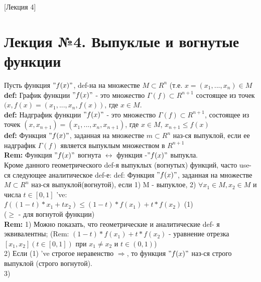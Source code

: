 [Лекция 4]

\newpage

\section{Лекция №4. Выпуклые и вогнутые функции}

Пусть функция $"f(x)"$, def-на на множестве $M \subset R^n$ (т.е. $x = (x_1, ... , x_n) \in M$ \\

\textbf{def:} График функции $"f(x)"$  - это множество $\Gamma(f) \subset R^{n+1}$ состоящее из точек $(x, f(x) = (x_1, ... , x_n, f(x))$, где $x \in M$. \\

\textbf{def:} Надграфик функции $"f(x)"$  - это множество $\Gamma(f) \subset R^{n+1}$, состоящее из точек $(x, x_{n+1}) = (x_1, ..., x_n, x_{n+1})$, где $x \in M$, $x_{n+1} \leqslant f(x)$ \\

\textbf{def:} Функция $"f(x)"$, заданная на множестве $m \subset R^n$ наз-ся выпуклой, если ее надграфик $\Gamma(f)$ является выпуклым множеством в $R^{n+1}$ \\

\textbf{Rem:} Функция $"f(x)"$ вогнута $\leftrightarrow$ функция -$"f(x)"$ выпукла. \\

Кроме данного геометрического def-я выпуклых (вогнутых) функций, часто use-ся следующее аналитическое def-е:
def: Функция $"f(x)"$, заданная на множестве $M \subset R^n$ наз-ся выпуклой(вогнутой), если 1) M - выпуклое, 2) $\forall x_1 \in M, x_2 \in M$ и числа $t \in [0,1]$ 've:\\
$f((1-t)*x_1+tx_2) \leqslant (1-t)*f(x_1) + t * f(x_2)$ (1) \\
($\geqslant$ - для вогнутой функции) \\

\textbf{Rem:} 1) Можно показать, что геометрические и аналитические def- я эквивалентны; (Rem: $(1-t)*f(x_1) + t * f(x_2)$ - уравнение отрезка $[x_1, x_2] (t \in [0, 1])$ при $x_1 \neq x_2$ и $t \in (0,1)$)\\
2) Если (1) 've строгое неравенство $\Rightarrow$, то функция $"f(x)"$ наз-ся строго выпуклой (строго вогнутой). \\
3) 
